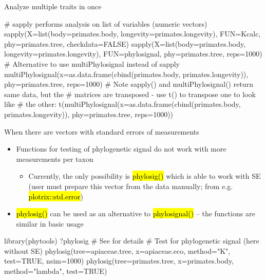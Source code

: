 \documentclass[compress, ucs, xelatex, 11pt, xcolor=svgnames,
  hyperref={
    bookmarks=true,
    unicode=true,
    colorlinks=true,
    pdftitle={Molecular data in R},
    plainpages=false,
    pdfauthor={Vojtech Zeisek},
    pdfsubject={Course about phylogeny and evolution in R},
    pdfcreator={XeLaTeX},
    pdfkeywords={R, evolution, phylogeny, molecular data},
    linkcolor=Tomato,
    anchorcolor=SaddleBrown,
    citecolor=Goldenrod,
    filecolor=DarkMagenta,
    menucolor=Sienna,
    urlcolor=DarkTurquoise,
    pdftex},
  url={hyphens, lowtilde} %
  ]{beamer}
\renewcommand{\texttt}[1]{\hl{\ttfamily #1}}
\begin{document}
\begin{frame}[fragile]{Analyze multiple traits in once}
  \begin{spluscode}
    # sapply performs analysis on list of variables (numeric vectors)
    sapply(X=list(body=primates.body, longevity=primates.longevity),
      FUN=Kcalc, phy=primates.tree, checkdata=FALSE)
    sapply(X=list(body=primates.body, longevity=primates.longevity),
      FUN=phylosignal, phy=primates.tree, reps=1000)
    # Alternative to use multiPhylosignal instead of sapply
    multiPhylosignal(x=as.data.frame(cbind(primates.body,
      primates.longevity)), phy=primates.tree, reps=1000)
    # Note sapply() and multiPhylosignal() return same data, but the
    # matrices are transposed - use t() to transpose one to look like
    # the other:
    t(multiPhylosignal(x=as.data.frame(cbind(primates.body,
      primates.longevity)), phy=primates.tree, reps=1000))
  \end{spluscode}
\end{frame}

\begin{frame}[fragile]{When there are vectors with standard errors of measurements}
  \begin{itemize}
    \item Functions for testing of phylogenetic signal do not work with more measurements per taxon
    \begin{itemize}
      \item Currently, the only possibility is \texttt{phylosig()} which is able to work with SE (user must prepare this vector from the data manually; from e.g. \texttt{plotrix::std.error})
    \end{itemize}
    \item \texttt{phylosig()} can be used as an alternative to \texttt{phylosignal()} -- the functions are similar in basic usage
  \end{itemize}
  \begin{spluscode}
    library(phytools)
    ?phylosig # See for details
    # Test for phylogenetic signal (here without SE)
    phylosig(tree=apiaceae.tree, x=apiaceae.eco, method="K", test=TRUE,
      nsim=1000)
    phylosig(tree=primates.tree, x=primates.body, method="lambda",
      test=TRUE)
  \end{spluscode}
\end{frame}
\end{document}
